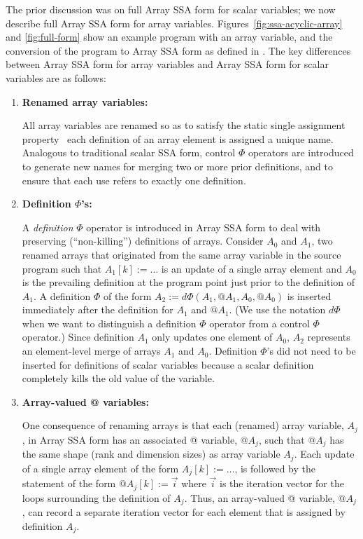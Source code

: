 The prior discussion was on full Array SSA form for scalar variables;
we now describe full Array SSA form for array variables.
Figures~\ref{fig:ssa-acyclic-array} and \ref{fig:full-form}
show an example program with an
array variable, and the conversion of the program to Array SSA form as
defined in \cite{KnSa98}.  The key differences between Array SSA form
for array variables and Array SSA form for scalar variables are as
follows:
\begin{enumerate}
\item {\bf Renamed array variables:}

All array variables are renamed so as to 
satisfy the static single assignment property \ie\ each
definition of an array element is assigned a unique name.  Analogous to traditional scalar SSA
form, control $\Phi$ operators are introduced to generate new names
for merging two or more prior definitions, and to ensure that each use
refers to exactly one definition.

\item {\bf Definition $\Phi$'s:}
\label{def:phi}


A  {\it definition} $\Phi$ operator is 
introduced in Array SSA form to deal with preserving (``non-killing'') definitions
of arrays.  Consider $A_0$ and $A_1$, two renamed 
arrays that originated from the same array variable in the source program
such that $A_1[k] := \ldots$
is an update of a single array element
and $A_0$ is the prevailing definition at the program point just
prior to the definition of $A_1$.
A definition $\Phi$ of the form $A_2 := d\Phi(A_1, @A_1, A_0, @A_0)$ 
is inserted immediately after the definition for $A_1$ and $@A_1$.
(We use the notation $d\Phi$ when we want to 
distinguish a definition $\Phi$ operator from a control $\Phi$ operator.)
Since definition $A_1$ only updates one element of $A_0$, $A_2$ represents
an element-level merge of arrays $A_1$ and $A_0$.
Definition $\Phi$'s did not need to be
inserted for definitions of scalar variables because a scalar definition completely kills the old value of
the variable.  

\item {\bf Array-valued @ variables:}

One consequence of renaming arrays is that
each (renamed) array variable, $A_j$, in Array SSA form has an associated 
@ variable, $@A_j$, such that $@A_j$ has
the same shape (rank and dimension sizes) as array variable $A_j$.
Each update of a single array element of the form $A_j[k] := \ldots$, 
is followed by the statement of the form $@A_j[k] := \vec{i}$
where $\vec{i}$ is the iteration vector for the loops surrounding
the definition of $A_j$.
Thus, an array-valued @ variable, $@A_j$,  
can record a separate iteration vector for
each element that is assigned by definition $A_j$.


\end{enumerate}
